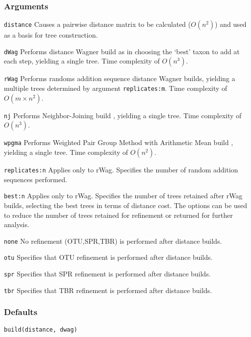 \documentclass[11pt]{article}
\begin{document}
		\subsubsection{Arguments}
		\texttt{distance} Causes a pairwise distance matrix to be calculated ($O(n^2)$) and used as a basis for tree construction.
		
		\noindent \texttt{dWag} Performs distance Wagner build as in \citep{Farris1972} choosing the `best' taxon to add at each step, 
		yielding a single tree.  Time complexity of $O(n^3)$.
		
		\smallskip
		\noindent \texttt{rWag} Performs randoms addition sequence distance Wagner builds, yielding a multiple trees determined 
		by argument \texttt{replicates:m}.  Time complexity of $O(m \times n^2)$.
		
		\smallskip		
		\noindent \texttt{nj} Performs Neighbor-Joining build \citep{Saitou1987}, yielding a single tree.  Time complexity of $O(n^3)$.
		
		\smallskip		
		\noindent \texttt{wpgma} Performs Weighted Pair Group Method with Arithmetic Mean build \citep{SokalandMichener1958}, 
		yielding a single tree.  Time complexity of $O(n^2)$.
		
		\smallskip		
		\noindent \texttt{replicates:n}  Applies only to rWag.  Specifies the number of random addition sequences performed. 
		
		\smallskip		
		\noindent \texttt{best:n} Applies only to rWag.  Specifies the number of trees retained after rWag builds, selecting 
		the best trees in terms of distance cost.  The options can be used to reduce
		the number of trees retained for refinement or returned for further analysis.  
		
		\smallskip		
		\noindent \texttt{none} No refinement (OTU,SPR,TBR) is performed after distance builds.
		
		\smallskip		
		\noindent \texttt{otu} Specifies that OTU refinement \citep{Wheeler2021} is performed after distance builds.
		
		\smallskip		
		\noindent \texttt{spr} Specifies that SPR refinement \citep{Dayhoff1969} is performed after distance builds.

		\smallskip		
		\noindent \texttt{tbr} Specifies that TBR refinement \citep{Farris1988, swofford1990a} is performed after distance builds.

		\subsubsection{Defaults}
			\texttt{build(distance, dwag)}
\end{document}
